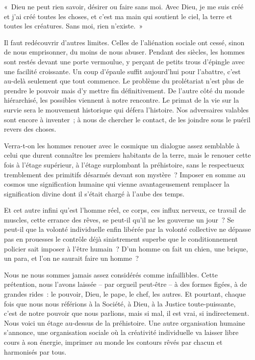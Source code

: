 \documentclass[french,twoside]{book} %
\newcommand{\astermono}{\medskip\centerline{\color{rubric}\large\selectfont{\syms ✻}}\medskip\par}%
\newenvironment{quoteblock}%
  {\begin{quoting}}
  {\end{quoting}}
\newenvironment{quotebar}{%
    \def\FrameCommand{{\color{rubric!10!}\vrule width 0.5em} \hspace{0.9em}}%
    \def\OuterFrameSep{\itemsep} %
    \MakeFramed {\advance\hsize-\width \FrameRestore}
  }%
  {%
    \endMakeFramed
  }
\renewenvironment{quoteblock}%
  {%
    \savenotes
    \setstretch{0.9}
    \normalfont
    \begin{quotebar}
  }
  {%
    \end{quotebar}
    \spewnotes
  }
\begin{document}
\begin{quoteblock}
\noindent « Dieu ne peut rien savoir, désirer ou faire sans moi. Avec Dieu, je me suis créé et j’ai créé toutes les choses, et c’est ma main qui soutient le ciel, la terre et toutes les créatures. Sans moi, rien n’existe. »\end{quoteblock}


\astermono

\noindent Il faut redécouvrir d’autres limites. Celles de l’aliénation sociale ont cessé, sinon de nous emprisonner, du moins de nous abuser. Pendant des siècles, les hommes sont restés devant une porte vermoulue, y perçant de petits trous d’épingle avec une facilité croissante. Un coup d’épaule suffit aujourd’hui pour l’abattre, c’est au-delà seulement que tout commence. Le problème du prolétariat n’est plus de prendre le pouvoir mais d’y mettre fin définitivement. De l’autre côté du monde hiérarchisé, les possibles viennent à notre rencontre. Le primat de la vie sur la survie sera le mouvement historique qui défera l’histoire. Nos adversaires valables sont encore à inventer ; à nous de chercher le contact, de les joindre sous le puéril revers des choses.\par
Verra-t-on les hommes renouer avec le cosmique un dialogue assez semblable à celui que durent connaître les premiers habitants de la terre, mais le renouer cette fois à l’étage supérieur, à l’étage surplombant la préhistoire, sans le respectueux tremblement des primitifs désarmés devant son mystère ? Imposer en somme au cosmos une signification humaine qui vienne avantageusement remplacer la signification divine dont il s’était chargé à l’aube des temps.\par
Et cet autre infini qu’est l’homme réel, ce corps, ces influx nerveux, ce travail de muscles, cette errance des rêves, se peut-il qu’il ne les gouverne un jour ? Se peut-il que la volonté individuelle enfin libérée par la volonté collective ne dépasse pas en prouesses le contrôle déjà sinistrement superbe que le conditionnement policier sait imposer à l’être humain ? D’un homme on fait un chien, une brique, un para, et l’on ne saurait faire un homme ?\par
Nous ne nous sommes jamais assez considérés comme infaillibles. Cette prétention, nous l’avons laissée – par orgueil peut-être – à des formes figées, à de grandes rides : le pouvoir, Dieu, le pape, le chef, les autres. Et pourtant, chaque fois que nous nous référions à la Société, à Dieu, à la Justice toute-puissante, c’est de notre pouvoir que nous parlions, mais si mal, il est vrai, si indirectement. Nous voici un étage au-dessus de la préhistoire. Une autre organisation humaine s’annonce, une organisation sociale où la créativité individuelle va laisser libre cours à son énergie, imprimer au monde les contours rêvés par chacun et harmonisés par tous.\par
\end{document}
